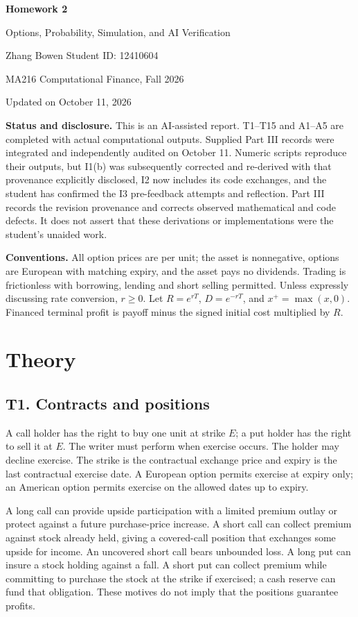 \documentclass[11pt,a4paper]{article}
\begin{document}
\begin{center}
{\LARGE\bfseries Homework 2}\par
{\large Options, Probability, Simulation, and AI Verification}\par
Zhang Bowen \quad Student ID: 12410604\par
MA216 Computational Finance, Fall 2026\par
Updated on October 11, 2026
\end{center}
\textbf{Status and disclosure.} This is an AI-assisted report. T1--T15 and A1--A5 are completed with actual computational outputs. Supplied Part III records were integrated and independently audited on October 11. Numeric scripts reproduce their outputs, but I1(b) was subsequently corrected and re-derived with that provenance explicitly disclosed, I2 now includes its code exchanges, and the student has confirmed the I3 pre-feedback attempts and reflection. Part III records the revision provenance and corrects observed mathematical and code defects. It does not assert that these derivations or implementations were the student's unaided work.

\textbf{Conventions.} All option prices are per unit; the asset is nonnegative, options are European with matching expiry, and the asset pays no dividends. Trading is frictionless with borrowing, lending and short selling permitted. Unless expressly discussing rate conversion, $r\geq0$. Let $R=e^{rT}$, $D=e^{-rT}$, and $x^+=\max(x,0)$. Financed terminal profit is payoff minus the signed initial cost multiplied by $R$.

\clearpage
\tableofcontents
\clearpage
\section{Theory}
\subsection{T1. Contracts and positions}
A call holder has the right to buy one unit at strike $E$; a put holder has the right to sell it at $E$. The writer must perform when exercise occurs. The holder may decline exercise. The strike is the contractual exchange price and expiry is the last contractual exercise date. A European option permits exercise at expiry only; an American option permits exercise on the allowed dates up to expiry.

A long call can provide upside participation with a limited premium outlay or protect against a future purchase-price increase. A short call can collect premium against stock already held, giving a covered-call position that exchanges some upside for income. An uncovered short call bears unbounded loss. A long put can insure a stock holding against a fall. A short put can collect premium while committing to purchase the stock at the strike if exercised; a cash reserve can fund that obligation. These motives do not imply that the positions guarantee profits.
\end{document}
